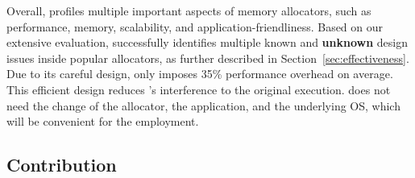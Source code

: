  

Overall, \MP{} profiles multiple important aspects of memory allocators, such as performance, memory, scalability, and application-friendliness. Based on our extensive evaluation, \MP{} successfully identifies multiple known and \textbf{unknown} design issues inside popular allocators, as further described in Section~\ref{sec:effectiveness}. Due to its careful design, \MP{} only imposes 35\% performance overhead on average. This efficient design reduces \MP{}'s interference to the original execution. \MP{} does not need the change of the allocator, the application, and the underlying OS, which will be convenient for the employment. 


\subsection*{Contribution}

